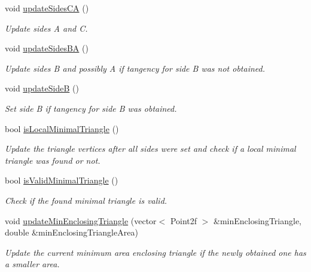 \begin{DoxyCompactItemize}
void \hyperlink{classmultiscale_1_1MinEnclosingTriangleFinder_a0f4a9131f5118fa0afc33344bdf67f16}{update\-Sides\-C\-A} ()
\begin{DoxyCompactList}\small\item\em \-Update sides \-A and \-C. \end{DoxyCompactList}\item 
void \hyperlink{classmultiscale_1_1MinEnclosingTriangleFinder_a12f1835531784519d618b86e889af06d}{update\-Sides\-B\-A} ()
\begin{DoxyCompactList}\small\item\em \-Update sides \-B and possibly \-A if tangency for side \-B was not obtained. \end{DoxyCompactList}\item 
void \hyperlink{classmultiscale_1_1MinEnclosingTriangleFinder_ab25b3b5dbe05cb06e83a49cd28b3116f}{update\-Side\-B} ()
\begin{DoxyCompactList}\small\item\em \-Set side \-B if tangency for side \-B was obtained. \end{DoxyCompactList}\item 
bool \hyperlink{classmultiscale_1_1MinEnclosingTriangleFinder_a97747be924fe1d8efaf6cad9d635419b}{is\-Local\-Minimal\-Triangle} ()
\begin{DoxyCompactList}\small\item\em \-Update the triangle vertices after all sides were set and check if a local minimal triangle was found or not. \end{DoxyCompactList}\item 
bool \hyperlink{classmultiscale_1_1MinEnclosingTriangleFinder_a4f9c533c8d5de8b95c38b71f50a5e00c}{is\-Valid\-Minimal\-Triangle} ()
\begin{DoxyCompactList}\small\item\em \-Check if the found minimal triangle is valid. \end{DoxyCompactList}\item 
void \hyperlink{classmultiscale_1_1MinEnclosingTriangleFinder_a8608cacc403c71d7ac9bc017d7b14e0c}{update\-Min\-Enclosing\-Triangle} (vector$<$ \-Point2f $>$ \&min\-Enclosing\-Triangle, double \&min\-Enclosing\-Triangle\-Area)
\begin{DoxyCompactList}\small\item\em \-Update the current minimum area enclosing triangle if the newly obtained one has a smaller area. \end{DoxyCompactList}\item 

\end{DoxyCompactItemize}
